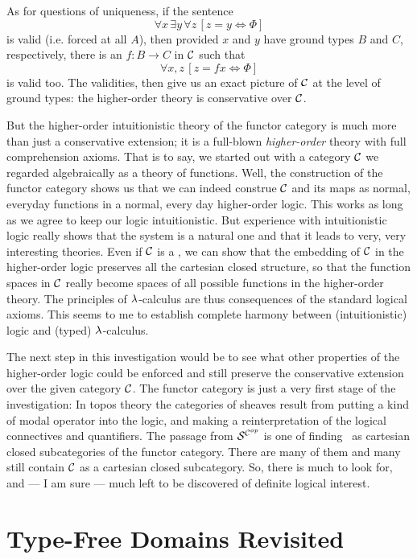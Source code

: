 As for questions of uniqueness, if the sentence
$$\forall x\, \exists y\, \forall z\, [z = y \iff \Phi]$$ is valid (i.e. forced at all
$A$), then provided $x$ and $y$ have ground types $B$ and $C$, respectively, there is an
$f : B\to C$ in $\mathcal C$ such that
$$\forall x,z\, [z = fx \iff \Phi]$$ is valid too. The validities, then give us an exact
picture of $\mathcal C$ at the level of ground types: the higher-order theory is conservative over
$\mathcal C$.

But the higher-order intuitionistic theory of the functor category is much more than just
a conservative extension; it is a full-blown {\it higher-order} theory with full
comprehension axioms. That is to say, we started out with a category $\mathcal C$ we regarded
algebraically as a theory of functions. Well, the construction of the functor category
shows us that we can indeed construe $\mathcal C$ and its maps as normal, everyday functions in a
normal, every day higher-order logic. This works as long as we agree to keep our logic
intuitionistic. But experience with intuitionistic logic really shows that the system is a
natural one and that it leads to very, very interesting theories. Even if $\mathcal C$ is a \ccc,
we can show that the embedding of $\mathcal C$ in the higher-order logic preserves all the
cartesian closed structure, so that the function spaces in $\mathcal C$ really become spaces of
all possible functions in the higher-order theory. The principles of $\lambda$-calculus are
thus consequences of the standard logical axioms. This seems to me to establish complete
harmony between (intuitionistic) logic and (typed) $\lambda$-calculus.

The next step in this investigation would be to see what other properties of the
higher-order logic could be enforced and still preserve the conservative extension over
the given category $\mathcal C$. The functor category is just a very first stage of the
investigation: In topos theory the categories of sheaves result from putting a kind of
modal operator into the logic, and making a reinterpretation of the logical connectives
and quantifiers. The passage from $\mathcal S^{\mathcal C^{op}}$ is one of finding \ccc\ as cartesian closed
subcategories of the functor category. There are many of them and many still contain $\mathcal C$
as a  cartesian closed subcategory. So, there is much to look for, and --- I am sure ---
much left to be discovered of definite logical interest.

\section{Type-Free Domains Revisited}

